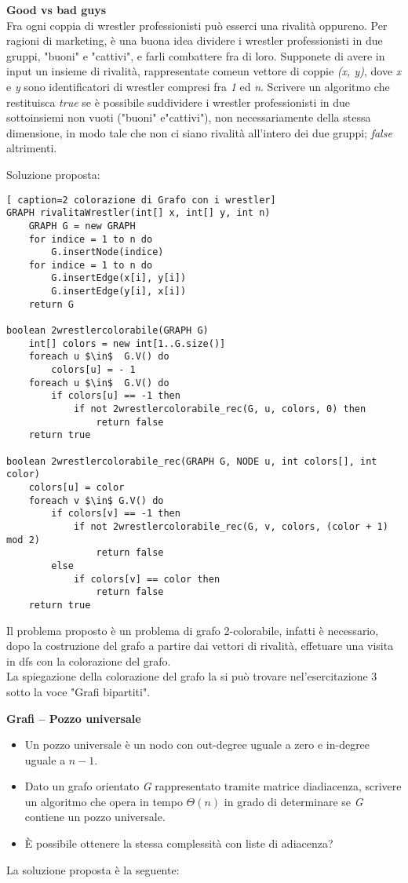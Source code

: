 \documentclass[../cheatSheetAlgoritmi.tex]{subfiles}
\begin{document}
\bigskip
\textbf{Good vs bad guys}\\
Fra ogni coppia di wrestler professionisti può esserci una rivalità oppureno. Per ragioni di marketing, è una buona idea dividere i wrestler professionisti in due gruppi, "buoni" e "cattivi", e farli combattere fra di loro. Supponete di avere in input un insieme di rivalità, rappresentate comeun vettore di coppie \textit{(x, y)}, dove \textit{x} e \textit{y} sono identificatori di wrestler compresi fra \textit{1} ed \textit{n}. Scrivere un algoritmo che restituisca \textit{true} se è possibile suddividere i wrestler professionisti in due sottoinsiemi non vuoti ("buoni" e"cattivi"), non necessariamente della stessa dimensione, in modo tale che non ci siano rivalità all’intero dei due gruppi; \textit{false} altrimenti.
 
\begin{flushleft}
Soluzione proposta:
\end{flushleft}
\begin{lstlisting}[ caption=2 colorazione di Grafo con i wrestler]
GRAPH rivalitaWrestler(int[] x, int[] y, int n)
	GRAPH G = new GRAPH
  	for indice = 1 to n do
    	G.insertNode(indice)
  	for indice = 1 to n do
    	G.insertEdge(x[i], y[i])
    	G.insertEdge(y[i], x[i])
  	return G

boolean 2wrestlercolorabile(GRAPH G)
	int[] colors = new int[1..G.size()]
  	foreach u $\in$  G.V() do
    	colors[u] = - 1
  	foreach u $\in$  G.V() do
    	if colors[u] == -1 then
      		if not 2wrestlercolorabile_rec(G, u, colors, 0) then
        		return false
  	return true

boolean 2wrestlercolorabile_rec(GRAPH G, NODE u, int colors[], int color)
	colors[u] = color
  	foreach v $\in$ G.V() do
    	if colors[v] == -1 then
      		if not 2wrestlercolorabile_rec(G, v, colors, (color + 1) mod 2)
        		return false
    	else
      		if colors[v] == color then
        		return false
  	return true
\end{lstlisting}
Il problema proposto è un problema di grafo 2-colorabile, infatti è necessario, dopo la costruzione del grafo a partire dai vettori di rivalità, effetuare una visita in dfs con la colorazione del grafo. \\
La spiegazione della colorazione del grafo la si può trovare nel'esercitazione 3 sotto la voce "Grafi bipartiti".
 
\textbf{Grafi – Pozzo universale}

\begin{itemize}
	\item Un pozzo universale è un nodo con out-degree uguale a zero e in-degree uguale a $n-1$.
	\item Dato un grafo orientato \textit{G} rappresentato tramite matrice diadiacenza, scrivere un algoritmo che opera in tempo $\Theta(n)$ in grado di determinare se \textit{G} contiene un pozzo universale.
	\item È possibile ottenere la stessa complessità con liste di adiacenza?
\end{itemize}
La soluzione proposta è la seguente:
\end{document}
